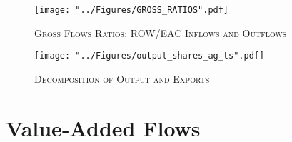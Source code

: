 \documentclass[compress]{beamer}
\begin{document}
\begin{frame}
\begin{figure}[h!]
\centering
\caption{\label{fig:GR}\textsc{Gross Flows Ratios: ROW/EAC Inflows and Outflows}}
\texttt{[image: "../Figures/GROSS\_RATIOS".pdf]} %
\end{figure}
\end{frame}

\begin{frame}
\begin{figure}[h!]
\centering
\caption{\label{fig:outshares_ag_ts}\textsc{Decomposition of Output and Exports}}
\texttt{[image: "../Figures/output\_shares\_ag\_ts".pdf]} %
\end{figure}
\end{frame}

\section{Value-Added Flows}
\end{document}
